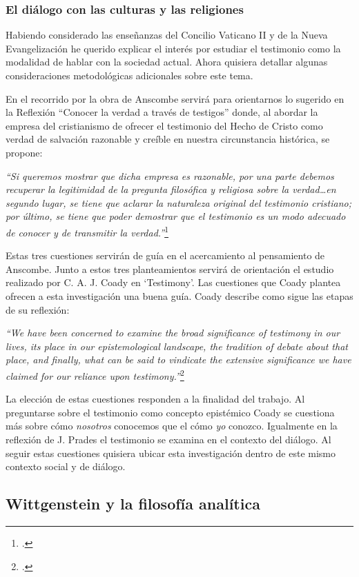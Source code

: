 \documentclass[11pt]{article}
\begin{document}
\subsubsection{El diálogo con las culturas y las religiones}
Habiendo considerado las enseñanzas del Concilio Vaticano II y de la Nueva Evangelización he querido explicar el interés por estudiar el testimonio como la modalidad de hablar con la sociedad actual. Ahora quisiera detallar algunas consideraciones metodológicas adicionales sobre este tema.

En el recorrido por la obra de Anscombe servirá para orientarnos lo sugerido en la Reflexión ``Conocer la verdad a través de testigos'' donde, al abordar la empresa del cristianismo de ofrecer el testimonio del Hecho de Cristo como verdad de salvación razonable y creíble en nuestra circunstancia histórica, se propone:

\emph{
``Si queremos mostrar que dicha empresa es razonable, por una parte debemos recuperar la legitimidad de la pregunta filosófica y religiosa sobre la verdad\ldots en segundo lugar, se tiene que aclarar la naturaleza original del testimonio cristiano; por último, se tiene que poder demostrar que el testimonio es un modo adecuado de conocer y de transmitir la verdad.''}\footcite[267]{pradesmulticr}

Estas tres cuestiones servirán de guía en el acercamiento al pensamiento de Anscombe. Junto a estos tres planteamientos servirá de orientación el estudio realizado por C. A. J. Coady en `Testimony'. Las cuestiones que Coady plantea ofrecen a esta investigación una buena guía. Coady describe como sigue las etapas de su reflexión:

\emph{``We have been concerned to examine the broad significance of testimony in our lives, its place in our epistemological landscape, the tradition of debate about that place, and finally, what can be said to vindicate the extensive significance we have claimed for our reliance upon testimony.''}\footcite[175]{testcoady}

La elección de estas cuestiones responden a la finalidad del trabajo. Al preguntarse sobre el testimonio como concepto epistémico Coady se cuestiona más sobre cómo \emph{nosotros} conocemos que el cómo \emph{yo} conozco. Igualmente en la reflexión de J. Prades el testimonio se examina en el contexto del diálogo. Al seguir estas cuestiones quisiera ubicar esta investigación dentro de este mismo contexto social y de diálogo.

\subsection{Wittgenstein y la filosofía analítica}
\end{document}
